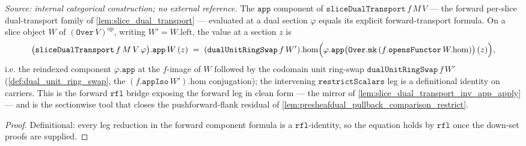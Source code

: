 \begin{lemma}\leanok
  \label{lem:slice_dual_transport_app_apply}
  \textit{Source: internal categorical construction; no external reference.}
  The \(\mathtt{app}\) component of \(\mathtt{sliceDualTransport}\,f\,M\,V\) --- the forward per-slice
  dual-transport family of \cref{lem:slice_dual_transport} --- evaluated at a dual section
  \(\varphi\) equals its explicit forward-transport formula. On a slice object \(W\) of
  \((\mathtt{Over}\,V)^{\mathrm{op}}\), writing \(W' = W.\mathrm{left}\), the value at a section
  \(z\) is
  \[
    \bigl(\mathtt{sliceDualTransport}\,f\,M\,V\,\varphi\bigr).\mathtt{app}\,W\,(z)
      \;=\;
    (\mathtt{dualUnitRingSwap}\,f\,W').\mathrm{hom}\Bigl(
      \varphi.\mathtt{app}\bigl(\mathtt{Over.mk}\,(f.\mathtt{opensFunctor}\,W.\mathrm{hom})\bigr)\,(z)\Bigr),
  \]
  i.e. the reindexed component \(\varphi.\mathtt{app}\) at the \(f\)-image of \(W\) followed by the
  codomain unit ring-swap \(\mathtt{dualUnitRingSwap}\,f\,W'\) (\cref{def:dual_unit_ring_swap}, the
  \((f.\mathtt{appIso}\,W').\mathrm{hom}\) conjugation); the intervening \(\mathtt{restrictScalars}\)
  leg is a definitional identity on carriers. This is the forward \(\mathtt{rfl}\) bridge exposing
  the forward leg in clean form --- the mirror of \cref{lem:slice_dual_transport_inv_app_apply} ---
  and is the sectionwise tool that closes the pushforward-flank residual of
  \cref{lem:presheafdual_pullback_comparison_restrict}.
\end{lemma}
\begin{proof}
  \leanok
  Definitional: every leg reduction in the forward component formula is a \(\mathtt{rfl}\)-identity,
  so the equation holds by \(\mathtt{rfl}\) once the down-set proofs are supplied.
\end{proof}

